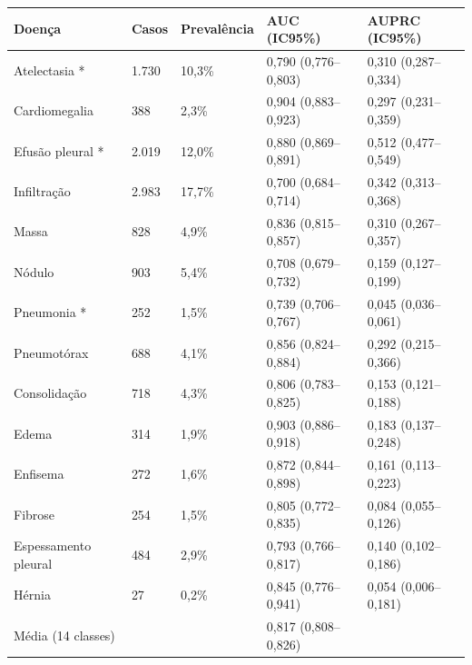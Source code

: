 \begin{tabular}{lllll}
\toprule
Doença & Casos & Prevalência & AUC (IC95\%) & AUPRC (IC95\%) \\
\midrule
Atelectasia * & 1.730 & 10,3\% & 0,790 (0,776–0,803) & 0,310 (0,287–0,334) \\
Cardiomegalia & 388 & 2,3\% & 0,904 (0,883–0,923) & 0,297 (0,231–0,359) \\
Efusão pleural * & 2.019 & 12,0\% & 0,880 (0,869–0,891) & 0,512 (0,477–0,549) \\
Infiltração & 2.983 & 17,7\% & 0,700 (0,684–0,714) & 0,342 (0,313–0,368) \\
Massa & 828 & 4,9\% & 0,836 (0,815–0,857) & 0,310 (0,267–0,357) \\
Nódulo & 903 & 5,4\% & 0,708 (0,679–0,732) & 0,159 (0,127–0,199) \\
Pneumonia * & 252 & 1,5\% & 0,739 (0,706–0,767) & 0,045 (0,036–0,061) \\
Pneumotórax & 688 & 4,1\% & 0,856 (0,824–0,884) & 0,292 (0,215–0,366) \\
Consolidação & 718 & 4,3\% & 0,806 (0,783–0,825) & 0,153 (0,121–0,188) \\
Edema & 314 & 1,9\% & 0,903 (0,886–0,918) & 0,183 (0,137–0,248) \\
Enfisema & 272 & 1,6\% & 0,872 (0,844–0,898) & 0,161 (0,113–0,223) \\
Fibrose & 254 & 1,5\% & 0,805 (0,772–0,835) & 0,084 (0,055–0,126) \\
Espessamento pleural & 484 & 2,9\% & 0,793 (0,766–0,817) & 0,140 (0,102–0,186) \\
Hérnia & 27 & 0,2\% & 0,845 (0,776–0,941) & 0,054 (0,006–0,181) \\
Média (14 classes) &  &  & 0,817 (0,808–0,826) &  \\
\bottomrule
\end{tabular}
